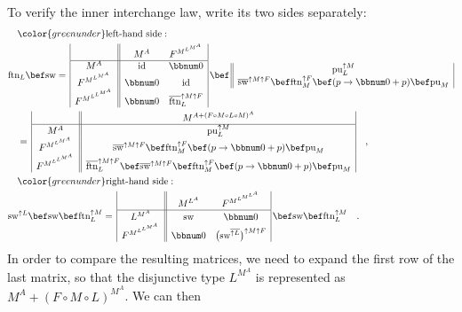 To verify the inner interchange law, write its two sides separately:
\begin{align*}
 & \quad{\color{greenunder}\text{left-hand side}:}\quad\\
 & \text{ftn}_{L}\bef\text{sw}=\,\begin{array}{|c||cc|}
 & M^{A} & F^{M^{L^{M^{A}}}}\\
\hline M^{A} & \text{id} & \bbnum 0\\
F^{M^{L^{M^{A}}}} & \bbnum 0 & \text{id}\\
F^{M^{L^{L^{M^{A}}}}} & \bbnum 0 & \overline{\text{ftn}}_{L}^{\uparrow M\uparrow F}
\end{array}\,\bef\,\begin{array}{||c|}
\text{pu}_{L}^{\uparrow M}\\
\overline{\text{sw}}^{\uparrow M\uparrow F}\bef\text{ftn}_{M}^{\uparrow F}\bef(p\rightarrow\bbnum 0+p)\bef\text{pu}_{M}
\end{array}\\
 & \quad=\,\begin{array}{|c||c|}
 & M^{A+(F\circ M\circ L\circ M)^{A}}\\
\hline M^{A} & \text{pu}_{L}^{\uparrow M}\\
F^{M^{L^{M^{A}}}} & \overline{\text{sw}}^{\uparrow M\uparrow F}\bef\text{ftn}_{M}^{\uparrow F}\bef(p\rightarrow\bbnum 0+p)\bef\text{pu}_{M}\\
F^{M^{L^{L^{M^{A}}}}} & \overline{\text{ftn}}_{L}^{\uparrow M\uparrow F}\bef\overline{\text{sw}}^{\uparrow M\uparrow F}\bef\text{ftn}_{M}^{\uparrow F}\bef(p\rightarrow\bbnum 0+p)\bef\text{pu}_{M}
\end{array}\quad,\\
 & \quad{\color{greenunder}\text{right-hand side}:}\quad\\
 & \text{sw}^{\uparrow L}\bef\text{sw}\bef\text{ftn}_{L}^{\uparrow M}=\,\begin{array}{|c||cc|}
 & M^{L^{A}} & F^{M^{L^{M^{L^{A}}}}}\\
\hline L^{M^{A}} & \text{sw} & \bbnum 0\\
F^{M^{L^{L^{M^{A}}}}} & \bbnum 0 & \big(\text{sw}^{\overline{\uparrow L}}\big)^{\uparrow M\uparrow F}
\end{array}\,\bef\text{sw}\bef\text{ftn}_{L}^{\uparrow M}\quad.
\end{align*}
In order to compare the resulting matrices, we need to expand the
first row of the last matrix, so that the disjunctive type $L^{M^{A}}$
is represented as $M^{A}+(F\circ M\circ L)^{M^{A}}$. We can then
